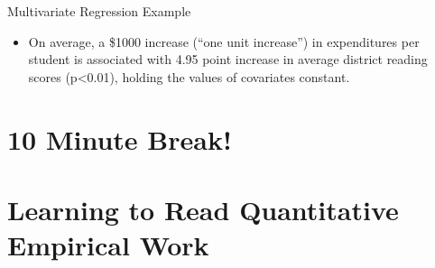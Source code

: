 \documentclass[
  8pt,
  ignorenonframetext,
  dvipsnames]{beamer}
\providecommand{\tightlist}{%
  \setlength{\itemsep}{0pt}\setlength{\parskip}{0pt}}
\let\olditem\item
\renewcommand{\item}{%
  \olditem\vspace{4pt}
}
\begin{document}
\begin{frame}{Multivariate Regression Example}
\begin{itemize}
  \begin{itemize}
  \tightlist
  \item
    On average, a \$1000 increase (``one unit increase'') in
    expenditures per student is associated with 4.95 point increase in
    average district reading scores (p\textless0.01), holding the values
    of covariates constant.
  \end{itemize}
\end{itemize}

\end{frame}

\hypertarget{minute-break}{%
\section{10 Minute Break!}\label{minute-break}}

\hypertarget{learning-to-read-quantitative-empirical-work}{%
\section{Learning to Read Quantitative Empirical
Work}\label{learning-to-read-quantitative-empirical-work}}
\end{document}
